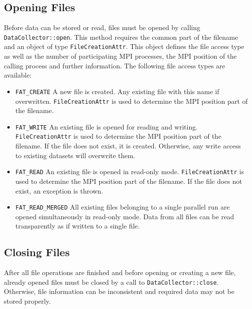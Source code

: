 \documentclass[a4paper,10pt,BCOR12mm]{report}
\begin{document}
\subsection{Opening Files}

Before data can be stored or read, files must be opened by calling
\texttt{DataCollector::open}. This method requires the common part of the filename
and an object of type \texttt{FileCreationAttr}.
This object defines the file access type as well as the number of
participating MPI processes, the MPI position of the calling process and further information.
The following file access types are available:
\begin{itemize}
	\item \texttt{FAT\_CREATE}
	A new file is created. Any existing file with this name if overwritten.
	\texttt{FileCreationAttr} is used to determine the MPI position part of the filename.

	\item \texttt{FAT\_WRITE}
	An existing file is opened for reading and writing.
	\texttt{FileCreationAttr} is used to determine the MPI position part of the filename.
	If the file does not exist, it is created.
	Otherwise, any write access to existing datasets will overwrite them.

	\item \texttt{FAT\_READ}
	An existing file is opened in read-only mode.
	\texttt{FileCreationAttr} is used to determine the MPI position part of the filename.
	If the file does not exist, an exception is thrown.

	\item \texttt{FAT\_READ\_MERGED}
	All existing files belonging to a single parallel run are opened simultaneously in read-only mode.
	Data from all files can be read transparently as if written to a single file.

\end{itemize}

\subsection{Closing Files}

After all file operations are finished and before opening or creating a new file,
already opened files must be closed by a call to \texttt{DataCollector::close}.
Otherwise, file information can be inconsistent and required data may not
be stored properly.

\end{document}
